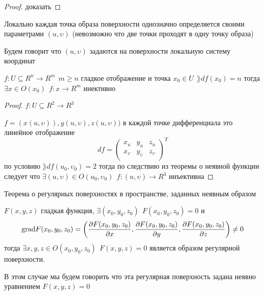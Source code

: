 \begin{proof}
  доказать
\end{proof}

\begin{block}[Следствие]
  Локально каждая точка образа поверхности однозначно определяется своими
  параметрами $(u, \upsilon)$ (невозможно что две точки проходят в одну точку
  образа)

  Будем говорит что $(u, \upsilon)$ задаются на поверхности локальную систему
  координат
\end{block}

\begin{theorem}
  $f: U \subseteq R^n \to R^m ~~ m \ge n$ гладкое отображение и точка
  $x_0 \in U ~~ \rang df(x_0) = n$ тогда $\exists x \in O(x_0) ~~
  f: x \to R^m$ инективно
\end{theorem}

\begin{proof}
  $f: U \subseteq R^2 \to R^3$

  $f = (x(u, \upsilon)), y(u, \upsilon), z(u, \upsilon))$ в каждой точке
  дифференциала это линейное отображение
  $$
  df =
  \left(
  \begin{array}{ccc}
    x_u & y_u & z_u \\
    x_{\upsilon} & y_{\upsilon} & z_{\upsilon} \\
  \end{array}
  \right)^T
  $$
  по условию $\rang df(u_0, \upsilon_0) = 2$ тогда по следствию из теоремы о
  неявной функции следует что $\exists (u, \upsilon) \in O(u_0, \upsilon_0) ~~
  f: (u, \upsilon) \to R^3$ инъективна
\end{proof}

\begin{title}[\Large]
  Теорема о регулярных поверхностях в пространстве, заданных неявным образом
\end{title}

\begin{theorem}
  $F(x,y,z)$ гладкая функция, $\exists (x_0, y_0, z_0) ~~ F(x_0, y_0, z_0) = 0$
  и
  $$
  \mathrm{grad} F(x_0, y_0, z_0) = \left(
  \frac{\partial F(x_0, y_0, z_0)}{\partial x},
  \frac{\partial F(x_0, y_0, z_0)}{\partial y},
  \frac{\partial F(x_0, y_0, z_0)}{\partial z}
  \right) \not= 0
  $$
  тогда $\exists x,y,z \in O(x_0, y_0, z_0) ~~ F(x, y, z) = 0$ является образом
  регулярной поверхности.

  В этом случае мы будем говорить что эта регулярная поверхность задана
  неявно уравнением $F(x, y, z) = 0$
\end{theorem}

